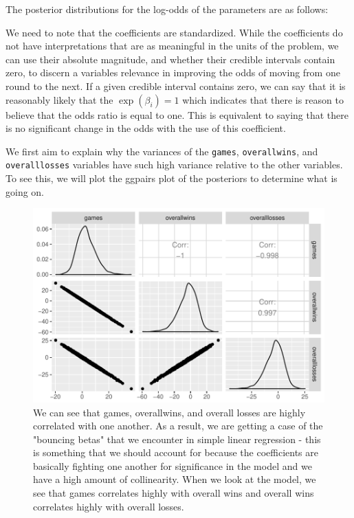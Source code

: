 \documentclass[10pt,a4paper, hidelinks]{article} %
\begin{document}
The posterior distributions for the log-odds of the parameters are as follows:

\begin{figure}[H]
	\centering
	
\end{figure}




We need to note that the coefficients are standardized. While the coefficients do not have interpretations that are as meaningful in the units of the problem,  we can use their absolute magnitude, and whether their credible intervals contain zero, to discern a variables relevance in improving the odds of moving from one round to the next. If a given credible interval contains zero, we can say that it is reasonably likely that the $\exp(\beta_i) = 1$ which indicates that there is reason to believe that the odds ratio is equal to one. This is equivalent to saying that there is no significant change in the odds with the use of this coefficient. 

We first aim to explain why the variances of the \texttt{games}, \texttt{overallwins}, and \texttt{overalllosses} variables have such high variance relative to the other variables. To see this, we will plot the ggpairs plot of the posteriors to determine what is going on.

\begin{figure}[H]
	\centering
	\includegraphics[width=0.7\linewidth]{../fig/polr_correlation}
	\caption{We can see that games, overallwins, and overall losses are highly correlated with one another. As a result, we are getting a case of the "bouncing betas" that we encounter in simple linear regression - this is something that we should account for because the coefficients are basically fighting one another for significance in the model and we have a high amount of collinearity. When we look at the model, we see that games correlates highly with overall wins and overall wins correlates highly with overall losses.}
	\label{fig:polrcorrelation}
\end{figure}
\end{document}
